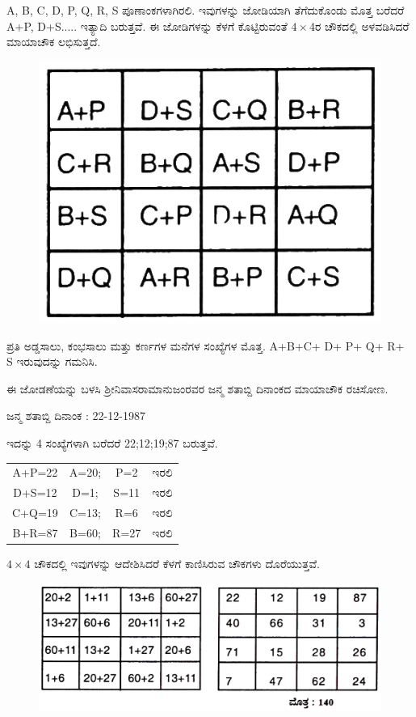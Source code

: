 A, B, C, D, P, Q, R, S ಪೂಣಾಂಕಗಳಾಗಿರಲಿ. ಇವುಗಳನ್ನು ಜೋಡಿಯಾಗಿ ತೆಗೆದುಕೊಂಡು ಮೊತ್ತ ಬರೆದರೆ A+P, D+S..... ಇತ್ಯಾದಿ ಬರುತ್ತವೆ. ಈ ಜೋಡಿಗಳನ್ನು ಕೆಳಗೆ ಕೊಟ್ಟಿರುವಂತೆ $4 \times 4$ರ ಚೌಕದಲ್ಲಿ ಅಳವಡಿಸಿದರೆ ಮಾಯಾಚೌಕ ಲಭಿಸುತ್ತದೆ.

\begin{figure}[h]
\includegraphics{src/figures/chap3/fig3.44.jpg}
\end{figure}

ಪ್ರತಿ ಅಡ್ಡಸಾಲು, ಕಂಭಸಾಲು ಮತ್ತು ಕರ್ಣಗಳ ಮನೆಗಳ ಸಂಖ್ಯೆಗಳ ಮೊತ್ತ. A+B+C+ D+ P+ Q+ R+ S ಇರುವುದನ್ನು ಗಮನಿಸಿ.

ಈ ಜೋಡಣೆಯನ್ನು ಬಳಸಿ ಶ್ರೀನಿವಾಸರಾಮಾನುಜಂರವರ ಜನ್ಮ ಶತಾಬ್ದಿ ದಿನಾಂಕದ ಮಾಯಾಚೌಕ ರಚಿಸೋಣ.

ಜನ್ಮ ಶತಾಬ್ದಿ ದಿನಾಂಕ : 22-12-1987

ಇದನ್ನು 4 ಸಂಖ್ಯೆಗಳಾಗಿ ಬರೆದರೆ 22;12;19;87 ಬರುತ್ತವೆ.

\begin{tabular}{cccc}
A+P=22 & A=20; & P=2 & ಇರಲಿ\\
D+S=12 & D=1; & S=11 & ಇರಲಿ\\
C+Q=19 & C=13; & R=6 & ಇರಲಿ\\
B+R=87 & B=60; & R=27 & ಇರಲಿ
\end{tabular}

$4 \times 4$ ಚೌಕದಲ್ಲಿ ಇವುಗಳನ್ನು ಆದೇಶಿಸಿದರೆ ಕೆಳಗೆ ಕಾಣಿಸಿರುವ ಚೌಕಗಳು ದೊರೆಯುತ್ತವೆ.
\begin{figure}[h]
\includegraphics{src/figures/chap3/fig3.45.jpg}
\end{figure}

